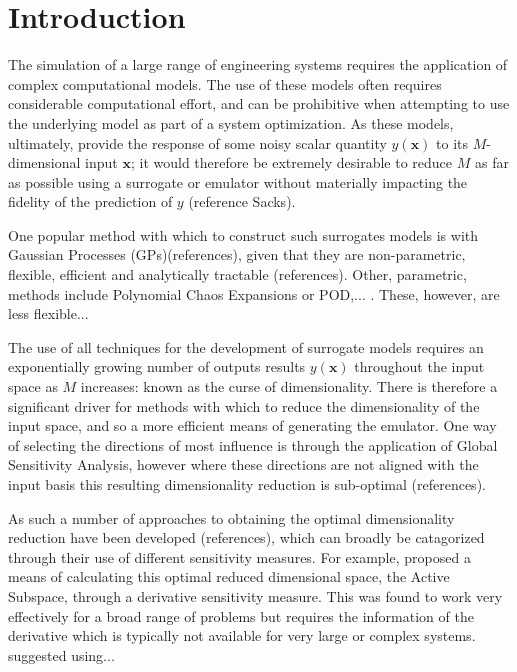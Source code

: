 \documentclass[preprint,12pt]{elsarticle}
\newcommand*{\M}[1]{\ensuremath{#1}\xspace}
\newcommand*{\vr}[1]{\M{\mathbf{#1}}}
\begin{document}

    \section{Introduction} \label{sec:Intro}
        The simulation of a large range of engineering systems requires the application of complex computational models. The use of these models often requires considerable computational effort, and can be prohibitive when attempting to use the underlying model as part of a system optimization. As these models, ultimately, provide the response of some noisy scalar quantity $y(\vr{x})$ to its \M{M}-dimensional input $\vr{x}$; it would therefore be extremely desirable to reduce \M{M} as far as possible using a surrogate or emulator without materially impacting the fidelity of the prediction of \M{y} (reference Sacks). 
        
        One popular method with which to construct such surrogates models is with Gaussian Processes (GPs)(references), given that they are non-parametric, flexible, efficient and analytically tractable (references). Other, parametric, methods include Polynomial Chaos Expansions or POD,... . These, however, are less flexible...
        
        The use of all techniques for the development of surrogate models requires an exponentially growing number of outputs results $y(\vr{x})$ throughout the input space as \M{M} increases: known as the curse of dimensionality. There is therefore a significant driver for methods with which to reduce the dimensionality of the input space, and so a more efficient means of generating the emulator. One way of selecting the directions of most influence is through the application of Global Sensitivity Analysis, however where these directions are not aligned with the input basis this resulting dimensionality reduction is sub-optimal (references).
        
        As such a number of approaches to obtaining the optimal dimensionality reduction have been developed (references), which can broadly be catagorized through their use of different sensitivity measures. For example, \cite{Constantine2014} proposed a means of calculating this optimal reduced dimensional space, the Active Subspace, through a derivative sensitivity measure. This was found to work very effectively for a broad range of problems but requires the information of the derivative which is typically not available for very large or complex systems. \cite{Liu2017} suggested using...
        
\end{document}
